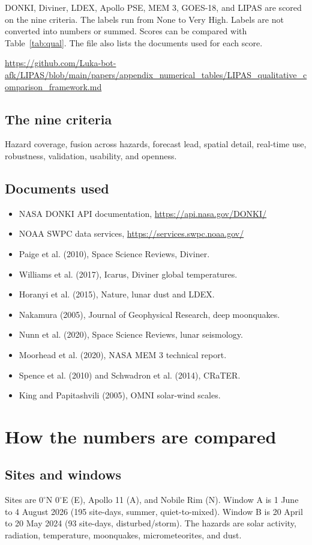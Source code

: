 DONKI, Diviner, LDEX, Apollo PSE, MEM 3, GOES-18, and LIPAS are scored on the nine criteria. The labels run from None to Very High. Labels are not converted into numbers or summed. Scores can be compared with Table~\ref{tab:qual}. The file also lists the documents used for each score.

\url{https://github.com/Luka-bot-afk/LIPAS/blob/main/papers/appendix_numerical_tables/LIPAS_qualitative_comparison_framework.md}

\subsection*{The nine criteria}
Hazard coverage, fusion across hazards, forecast lead, spatial detail, real-time use, robustness, validation, usability, and openness.

\subsection*{Documents used}
\begin{itemize}
\item NASA DONKI API documentation, \url{https://api.nasa.gov/DONKI/}
\item NOAA SWPC data services, \url{https://services.swpc.noaa.gov/}
\item Paige et al. (2010), Space Science Reviews, Diviner.
\item Williams et al. (2017), Icarus, Diviner global temperatures.
\item Horanyi et al. (2015), Nature, lunar dust and LDEX.
\item Nakamura (2005), Journal of Geophysical Research, deep moonquakes.
\item Nunn et al. (2020), Space Science Reviews, lunar seismology.
\item Moorhead et al. (2020), NASA MEM 3 technical report.
\item Spence et al. (2010) and Schwadron et al. (2014), CRaTER.
\item King and Papitashvili (2005), OMNI solar-wind scales.
\end{itemize}

\section{How the numbers are compared}

\subsection*{Sites and windows}
Sites are $0^{\circ}$N $0^{\circ}$E (E), Apollo 11 (A), and Nobile Rim (N). Window A is 1 June to 4 August 2026 (195 site-days, summer, quiet-to-mixed). Window B is 20 April to 20 May 2024 (93 site-days, disturbed/storm). The hazards are solar activity, radiation, temperature, moonquakes, micrometeorites, and dust.

